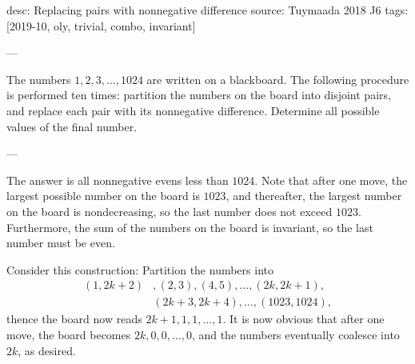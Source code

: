 desc: Replacing pairs with nonnegative difference
source: Tuymaada 2018 J6
tags: [2019-10, oly, trivial, combo, invariant]

---

The numbers $1,2,3,\ldots,1024$ are written on a blackboard. The following procedure is performed ten times: partition the numbers on the board into disjoint pairs, and replace each pair with its nonnegative difference. Determine all possible values of the final number.

---

The answer is all nonnegative evens less than $1024$. Note that after one move, the largest possible number on the board is $1023$, and thereafter, the largest number on the board is nondecreasing, so the last number does not exceed $1023$. Furthermore, the sum of the numbers on the board is invariant, so the last number must be even.

Consider this construction: Partition the numbers into
\begin{align*}
    (1,2k+2)&,(2,3),(4,5),\ldots,(2k,2k+1),\\ &(2k+3,2k+4),\ldots,(1023,1024),
\end{align*}
thence the board now reads $2k+1,1,1,\ldots,1$. It is now obvious that after one move, the board becomes $2k,0,0,\ldots,0$, and the numbers eventually coalesce into $2k$, as desired.

